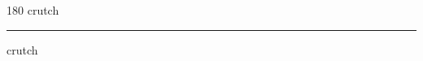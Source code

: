 
\begin{frame}
\begin{center}
\begin{turn}{180}
{\fontsize{2.5cm}{1em}\selectfont crutch}
\end{turn}
\vspace{1em}\par  
\hrule
\vspace{1em}\par  
{\fontsize{2.5cm}{1em}\selectfont crutch}
\end{center}
\end{frame}
